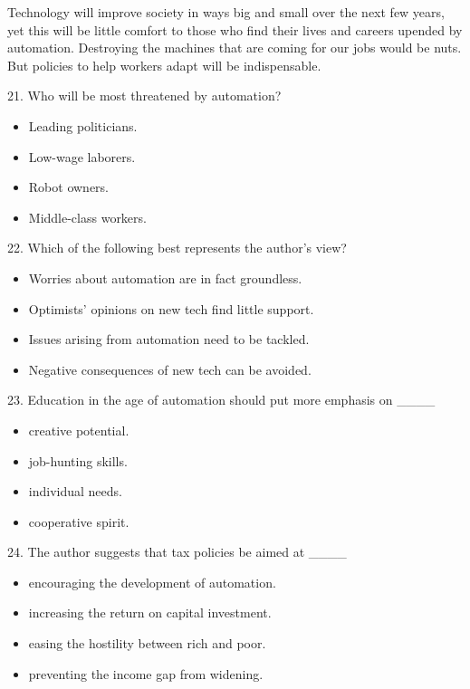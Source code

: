 \documentclass[UTF8,11pt]{ctexart}
\begin{document}
Technology will improve society in ways big and small over the next few years, yet this will be little comfort to those who find their lives and careers upended by automation. Destroying the machines that are coming for our jobs would be nuts. But policies to help workers adapt will be indispensable.


21. Who will be most threatened by automation?


\begin{itemize}[leftmargin=2em,itemsep=.2em,topsep=.4em]\item[A.] Leading politicians.
\item[B.] Low-wage laborers.
\item[C.] Robot owners.
\item[D.] Middle-class workers.
\end{itemize}

22. Which of the following best represents the author’s view?


\begin{itemize}[leftmargin=2em,itemsep=.2em,topsep=.4em]\item[A.] Worries about automation are in fact groundless.
\item[B.] Optimists’ opinions on new tech find little support.
\item[C.] Issues arising from automation need to be tackled.
\item[D.] Negative consequences of new tech can be avoided.
\end{itemize}

23. Education in the age of automation should put more emphasis on \_\_\_\_


\begin{itemize}[leftmargin=2em,itemsep=.2em,topsep=.4em]\item[A.] creative potential.
\item[B.] job-hunting skills.
\item[C.] individual needs.
\item[D.] cooperative spirit.
\end{itemize}

24. The author suggests that tax policies be aimed at \_\_\_\_


\begin{itemize}[leftmargin=2em,itemsep=.2em,topsep=.4em]\item[A.] encouraging the development of automation.
\item[B.] increasing the return on capital investment.
\item[C.] easing the hostility between rich and poor.
\item[D.] preventing the income gap from widening.
\end{itemize}
\end{document}
